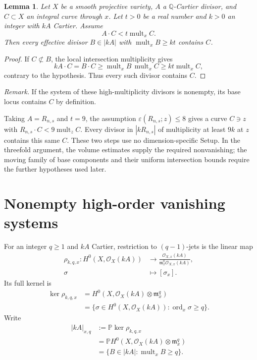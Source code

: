 \documentclass[12pt,a4paper,psamsfonts]{amsart}
\newtheorem{lemma}{Lemma}[section]
\theoremstyle{definition}
\newcommand{\OO}{\mathcal O}
\begin{document}
\begin{lemma}\label{lem:multiplicity-forces-containment}
Let $X$ be a smooth projective variety, $A$ a $\mathbb{Q}$-Cartier
divisor, and $C\subset X$ an integral curve through $x$.
Let $t>0$ be a real number and $k>0$ an integer with $kA$ Cartier.
Assume
\[
 A\cdot C<t\operatorname{mult}_x C.
\]
Then every effective divisor $B\in|kA|$ with
$\operatorname{mult}_x B\ge kt$ contains $C$.
\end{lemma}
\begin{proof}
If $C\not\subset B$, the local intersection multiplicity gives
\[
 kA\cdot C=B\cdot C
 \ge\operatorname{mult}_x B\,\operatorname{mult}_x C
 \ge kt\operatorname{mult}_x C,
\]
contrary to the hypothesis. Thus every such divisor contains $C$.
\end{proof}

\noindent\emph{Remark.} If the system of these high-multiplicity
divisors is nonempty, its base locus contains $C$ by definition.

Taking $A=R_{n,s}$ and $t=9$, the assumption
$\varepsilon(R_{n,s};z)\le8$ gives a curve $C\ni z$ with
$R_{n,s}\cdot C<9\operatorname{mult}_z C$.
Every divisor in $|kR_{n,s}|$ of multiplicity at least $9k$ at
$z$ contains this same $C$. These two steps use no
dimension-specific Setup. In the threefold argument, the
volume estimates supply the required nonvanishing; the moving
family of base components and their uniform intersection bounds
require the further hypotheses used later.


\section{Nonempty high-order vanishing systems}
For an integer $q\ge1$ and $kA$ Cartier, restriction to
$(q-1)$-jets is the linear map
\[
 \begin{aligned}
 \rho_{k,q,x}:H^0(X,\OO_X(kA))
 &\longrightarrow
 \frac{\OO_{X,x}(kA)}{\mathfrak m_x^q\OO_{X,x}(kA)},\\
 \sigma&\longmapsto[\sigma_x].
 \end{aligned}
\]
Its full kernel is
\[
 \begin{aligned}
 \ker\rho_{k,q,x}
 &=H^0(X,\OO_X(kA)\otimes\mathfrak m_x^q)\\
 &=\{\sigma\in H^0(X,\OO_X(kA)):
                 \operatorname{ord}_x\sigma\ge q\}.
 \end{aligned}
\]
Write
\[
 \begin{aligned}
 |kA|_{x,q}&:=\mathbb P\ker\rho_{k,q,x}\\
 &=\mathbb P H^0(X,\OO_X(kA)\otimes\mathfrak m_x^q)\\
 &=\{B\in|kA|:\operatorname{mult}_x B\ge q\}.
 \end{aligned}
\]
\end{document}
